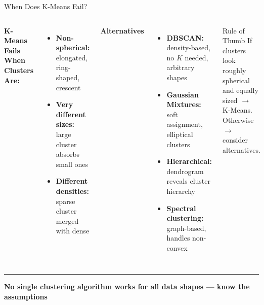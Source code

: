 \documentclass[8pt,aspectratio=169]{beamer}
\newcommand{\bottomnote}[1]{%
\vfill
\vspace{-2mm}
\textcolor{mllavender2}{\rule{\textwidth}{0.4pt}}
\vspace{1mm}
\footnotesize
\textbf{#1}
}
\newenvironment{compactlist}{%
  \begin{itemize}%
    \setlength{\itemsep}{2pt}%
    \setlength{\parskip}{0pt}%
    \setlength{\parsep}{0pt}%
}{%
  \end{itemize}%
}
\begin{document}
\begin{frame}[t]{When Does K-Means Fail?}
\begin{columns}[T]
\small
\textcolor{mlred}{\textbf{K-Means Fails When Clusters Are:}}

\footnotesize
\begin{compactlist}
\item \footnotesize \textbf{Non-spherical:} elongated, ring-shaped, crescent
\item \footnotesize \textbf{Very different sizes:} large cluster absorbs small ones
\item \footnotesize \textbf{Different densities:} sparse cluster merged with dense
\end{compactlist}

\vspace{2mm}

\small
\textcolor{mlgreen}{\textbf{Alternatives}}

\footnotesize
\begin{compactlist}
\item \footnotesize \textbf{DBSCAN:} density-based, no $K$ needed, arbitrary shapes
\item \footnotesize \textbf{Gaussian Mixtures:} soft assignment, elliptical clusters
\item \footnotesize \textbf{Hierarchical:} dendrogram reveals cluster hierarchy
\item \footnotesize \textbf{Spectral clustering:} graph-based, handles non-convex
\end{compactlist}

\vspace{2mm}
\begin{block}{Rule of Thumb}
\footnotesize If clusters look roughly spherical and equally sized $\to$ K-Means. Otherwise $\to$ consider alternatives.
\end{block}
\end{columns}
\bottomnote{No single clustering algorithm works for all data shapes --- know the assumptions}
\end{frame}
\end{document}
